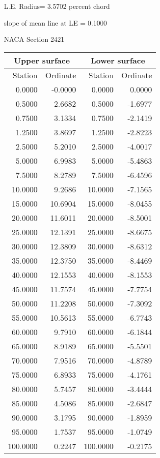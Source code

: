 \documentclass[11pt]{book}
\begin{document}
L.E. Radius=  3.5702 percent chord


 slope of mean line at LE =  0.1000
 \newpage
  \label{s2421}
 \begin{Large}
 NACA Section 2421
 \end{Large}
  
 \vspace{8mm}
 \begin{tabular}{|r|r|r|r|} \hline 
 \multicolumn{2}{|c|}{Upper surface} & \multicolumn{2}{|c|}{Lower surface} \\
 \hline
 Station & Ordinate & Station & Ordinate \\
 \hline
0.0000 & -0.0000 & 0.0000 & 0.0000 \\
0.5000 & 2.6682 & 0.5000 & -1.6977 \\
0.7500 & 3.1334 & 0.7500 & -2.1419 \\
1.2500 & 3.8697 & 1.2500 & -2.8223 \\
2.5000 & 5.2010 & 2.5000 & -4.0017 \\
5.0000 & 6.9983 & 5.0000 & -5.4863 \\
7.5000 & 8.2789 & 7.5000 & -6.4596 \\
10.0000 & 9.2686 & 10.0000 & -7.1565 \\
15.0000 & 10.6904 & 15.0000 & -8.0455 \\
20.0000 & 11.6011 & 20.0000 & -8.5001 \\
25.0000 & 12.1391 & 25.0000 & -8.6675 \\
30.0000 & 12.3809 & 30.0000 & -8.6312 \\
35.0000 & 12.3750 & 35.0000 & -8.4469 \\
40.0000 & 12.1553 & 40.0000 & -8.1553 \\
45.0000 & 11.7574 & 45.0000 & -7.7754 \\
50.0000 & 11.2208 & 50.0000 & -7.3092 \\
55.0000 & 10.5613 & 55.0000 & -6.7743 \\
60.0000 & 9.7910 & 60.0000 & -6.1844 \\
65.0000 & 8.9189 & 65.0000 & -5.5501 \\
70.0000 & 7.9516 & 70.0000 & -4.8789 \\
75.0000 & 6.8933 & 75.0000 & -4.1761 \\
80.0000 & 5.7457 & 80.0000 & -3.4444 \\
85.0000 & 4.5086 & 85.0000 & -2.6847 \\
90.0000 & 3.1795 & 90.0000 & -1.8959 \\
95.0000 & 1.7537 & 95.0000 & -1.0749 \\
100.0000 & 0.2247 & 100.0000 & -0.2175 \\
 \hline 
 \end{tabular}
\end{document}
